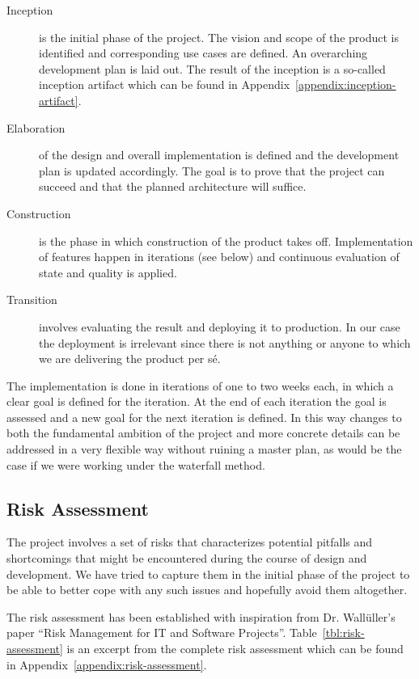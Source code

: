 \begin{description}
\item[Inception] is the initial phase of the project. The vision and scope of
  the product is identified and corresponding use cases are defined. An
  overarching development plan is laid out. The result of the inception is a
  so-called inception artifact which can be found in
  Appendix~\ref{appendix:inception-artifact}.

\item[Elaboration] of the design and overall implementation is defined and the
  development plan is updated accordingly. The goal is to prove that the project
  can succeed and that the planned architecture will suffice.

\item[Construction] is the phase in which construction of the product takes
  off. Implementation of features happen in iterations (see below) and
  continuous evaluation of state and quality is applied.

\item[Transition] involves evaluating the result and deploying it to
  production. In our case the deployment is irrelevant since there is not
  anything or anyone to which we are delivering the product per s\'e.

\end{description}

The implementation is done in iterations of one to two weeks each, in which a
clear goal is defined for the iteration. At the end of each iteration the goal
is assessed and a new goal for the next iteration is defined. In this way
changes to both the fundamental ambition of the project and more concrete
details can be addressed in a very flexible way without ruining a master plan,
as would be the case if we were working under the waterfall method.

\subsection{Risk Assessment}
\label{sec:project-mgmt:risk-assessment}

The project involves a set of risks that characterizes potential pitfalls and
shortcomings that might be encountered during the course of design and
development. We have tried to capture them in the initial phase of the project
to be able to better cope with any such issues and hopefully avoid them
altogether.

The risk assessment has been established with inspiration from Dr. Wall\"uller's
paper ``Risk Management for IT and Software
Projects''\cite{risk-assessment}. Table~\ref{tbl:risk-assessment} is an excerpt
from the complete risk assessment which can be found in
Appendix~\ref{appendix:risk-assessment}.

